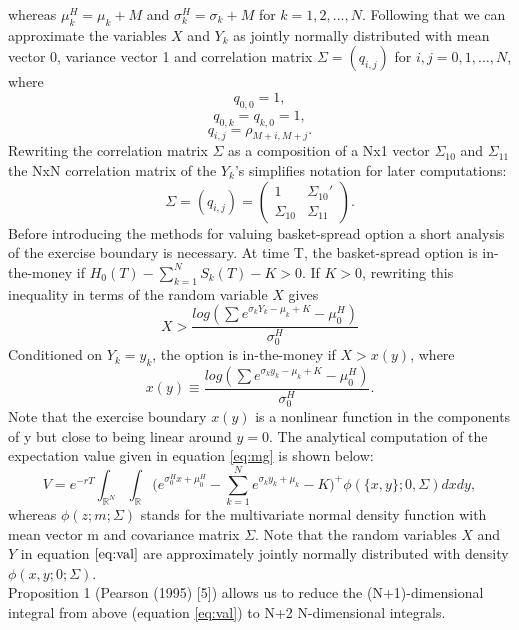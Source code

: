 \documentclass[a4paper]{article}
\begin{document}
whereas $\mu_k^H = \mu_k+M$ and $\sigma_k^H = \sigma_k+M$ for $k=1,2,...,N$. Following that we can approximate the variables $X$ and $Y_k$ as jointly normally distributed with mean vector 0, variance vector 1 and correlation matrix $\Sigma = (q_{i,j})$ for $i,j=0,1,...,N$, where 
$$q_{0,0}=1,$$ 
$$q_{0,k}=q_{k,0}=1,$$
$$q_{i,j}=\rho_{M+i,M+j}.$$
Rewriting the correlation matrix $\Sigma$ as a composition of a Nx1 vector $\Sigma_{10}$ and $\Sigma_{11}$ the NxN correlation matrix of the $Y_k$'s simplifies notation for later computations:
$$\Sigma = (q_{i,j}) = \begin{pmatrix} 1 & \Sigma_{10}' \\ \Sigma_{10} & \Sigma_{11} \end{pmatrix}.$$ 
Before introducing the methods for valuing basket-spread option a short analysis of the exercise boundary is necessary. At time T, the  basket-spread option is in-the-money 
if $H_0(T) - \sum_{k=1}^N S_k(T)-K>0$. If $K>0$, rewriting this inequality in terms of the random variable $X$ gives
$$X>\frac{log(\sum e^{\sigma_kY_k-\mu_k+K}-\mu_0^H)}{\sigma_0^H}$$
Conditioned on $Y_k=y_k$, the option is in-the-money if $X>x(y)$, where
$$x(y)\equiv\frac{log(\sum e^{\sigma_ky_k-\mu_k+K}-\mu_0^H)}{\sigma_0^H}.$$
Note that the exercise boundary $x(y)$ is a nonlinear function in the components of y but close to being linear around $y=0$.
The analytical computation of the expectation value given in equation \ref{eq:mg} is shown below:
\begin{equation}
\label{eq:val}
V= e^{-rT} \int_{\mathbb{R}^N} \int_\mathbb{R} \big(e^{\sigma_0^Hx+\mu_0^H}-\sum_{k=1}^Ne^{\sigma_ky_k+\mu_k}-K\big)^+\phi(\{x,y\};0,\Sigma) dx dy,
\end{equation}
whereas $\phi(z;m;\Sigma)$ stands for the multivariate normal density function with mean vector m and covariance matrix $\Sigma$. Note that the random variables $X$ and $Y$ in equation $\ref{eq:val}$ are approximately jointly normally distributed with density $\phi({x,y};0;\Sigma)$.\\
Proposition 1 (Pearson (1995) [5]) allows us to reduce the (N+1)-dimensional integral from above (equation \ref{eq:val}) to N+2 N-dimensional integrals.
\end{document}
